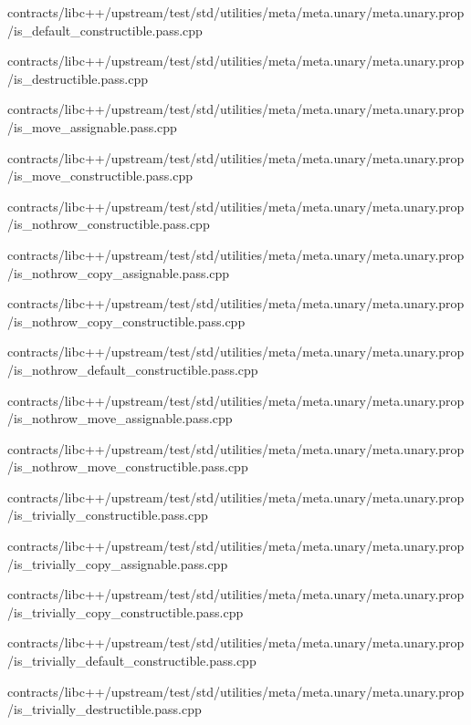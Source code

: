 \begin{DoxyCompactItemize}
contracts/libc++/upstream/test/std/utilities/meta/meta.\+unary/meta.\+unary.\+prop/is\+\_\+default\+\_\+constructible.\+pass.\+cpp\item 
contracts/libc++/upstream/test/std/utilities/meta/meta.\+unary/meta.\+unary.\+prop/is\+\_\+destructible.\+pass.\+cpp\item 
contracts/libc++/upstream/test/std/utilities/meta/meta.\+unary/meta.\+unary.\+prop/is\+\_\+move\+\_\+assignable.\+pass.\+cpp\item 
contracts/libc++/upstream/test/std/utilities/meta/meta.\+unary/meta.\+unary.\+prop/is\+\_\+move\+\_\+constructible.\+pass.\+cpp\item 
contracts/libc++/upstream/test/std/utilities/meta/meta.\+unary/meta.\+unary.\+prop/is\+\_\+nothrow\+\_\+constructible.\+pass.\+cpp\item 
contracts/libc++/upstream/test/std/utilities/meta/meta.\+unary/meta.\+unary.\+prop/is\+\_\+nothrow\+\_\+copy\+\_\+assignable.\+pass.\+cpp\item 
contracts/libc++/upstream/test/std/utilities/meta/meta.\+unary/meta.\+unary.\+prop/is\+\_\+nothrow\+\_\+copy\+\_\+constructible.\+pass.\+cpp\item 
contracts/libc++/upstream/test/std/utilities/meta/meta.\+unary/meta.\+unary.\+prop/is\+\_\+nothrow\+\_\+default\+\_\+constructible.\+pass.\+cpp\item 
contracts/libc++/upstream/test/std/utilities/meta/meta.\+unary/meta.\+unary.\+prop/is\+\_\+nothrow\+\_\+move\+\_\+assignable.\+pass.\+cpp\item 
contracts/libc++/upstream/test/std/utilities/meta/meta.\+unary/meta.\+unary.\+prop/is\+\_\+nothrow\+\_\+move\+\_\+constructible.\+pass.\+cpp\item 
contracts/libc++/upstream/test/std/utilities/meta/meta.\+unary/meta.\+unary.\+prop/is\+\_\+trivially\+\_\+constructible.\+pass.\+cpp\item 
contracts/libc++/upstream/test/std/utilities/meta/meta.\+unary/meta.\+unary.\+prop/is\+\_\+trivially\+\_\+copy\+\_\+assignable.\+pass.\+cpp\item 
contracts/libc++/upstream/test/std/utilities/meta/meta.\+unary/meta.\+unary.\+prop/is\+\_\+trivially\+\_\+copy\+\_\+constructible.\+pass.\+cpp\item 
contracts/libc++/upstream/test/std/utilities/meta/meta.\+unary/meta.\+unary.\+prop/is\+\_\+trivially\+\_\+default\+\_\+constructible.\+pass.\+cpp\item 
contracts/libc++/upstream/test/std/utilities/meta/meta.\+unary/meta.\+unary.\+prop/is\+\_\+trivially\+\_\+destructible.\+pass.\+cpp\item 

\end{DoxyCompactItemize}
